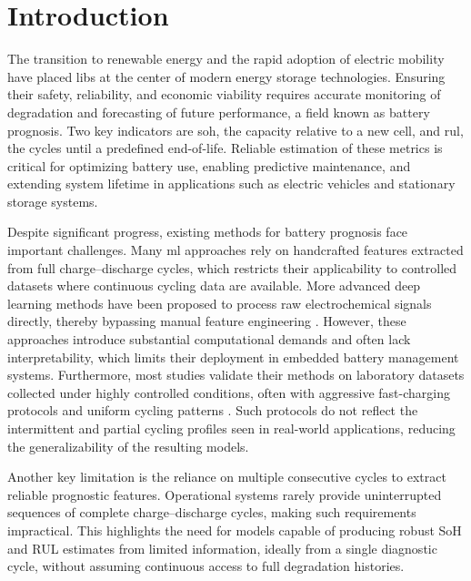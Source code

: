 \section{Introduction} \label{sec:intro}

The transition to renewable energy and the rapid adoption of electric mobility have placed \acf{libs} at the center of modern energy storage technologies. Ensuring their safety, reliability, and economic viability requires accurate monitoring of degradation and forecasting of future performance, a field known as battery prognosis. Two key indicators are \acf{soh}, the capacity relative to a new cell, and \acf{rul}, the cycles until a predefined end-of-life. Reliable estimation of these metrics is critical for optimizing battery use, enabling predictive maintenance, and extending system lifetime in applications such as electric vehicles and stationary storage systems.  

Despite significant progress, existing methods for battery prognosis face important challenges. Many \acf{ml} approaches rely on handcrafted features extracted from full charge--discharge cycles, which restricts their applicability to controlled datasets where continuous cycling data are available. More advanced deep learning methods have been proposed to process raw electrochemical signals directly, thereby bypassing manual feature engineering \cite{Che2022, Lv2024}. However, these approaches introduce substantial computational demands and often lack interpretability, which limits their deployment in embedded battery management systems. Furthermore, most studies validate their methods on laboratory datasets collected under highly controlled conditions, often with aggressive fast-charging protocols and uniform cycling patterns \cite{Jafari2024, Liu2025}. Such protocols do not reflect the intermittent and partial cycling profiles seen in real-world applications, reducing the generalizability of the resulting models.  

Another key limitation is the reliance on multiple consecutive cycles to extract reliable prognostic features. Operational systems rarely provide uninterrupted sequences of complete charge--discharge cycles, making such requirements impractical. This highlights the need for models capable of producing robust SoH and RUL estimates from limited information, ideally from a single diagnostic cycle, without assuming continuous access to full degradation histories.

